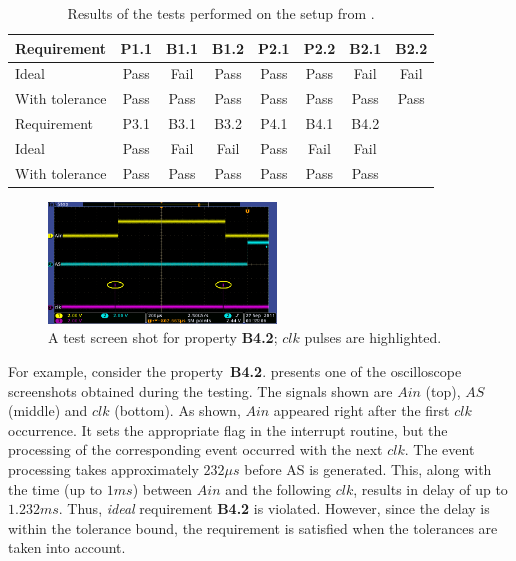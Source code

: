 \begin{table}[!b]


{
\begin{tabular}{|l|c|c|c|c|c|c|c|}
\hline
Requirement 		& P1.1 & B1.1 & B1.2 & P2.1 & P2.2 & B2.1 & B2.2 \\\hline
Ideal 					& Pass & Fail & Pass & Pass & Pass & Fail & Fail \\\hline
With tolerance 	& Pass & Pass & Pass & Pass & Pass & Pass & Pass \\\hline
\hline
Requirement 		& P3.1 & B3.1 & B3.2 & P4.1 & B4.1 & B4.2 &\\\hline
Ideal 					& Pass & Fail & Fail & Pass & Fail & Fail &\\\hline
With tolerance 	& Pass & Pass & Pass & Pass & Pass & Pass &\\\hline
\end{tabular}}
\caption{Results of the tests performed on the setup from .}
\label{tab:test_results}
\end{table}


\begin{figure} [!t]
\center
		\includegraphics[width=0.54\textwidth]{figs/tek00003_new1.png}
\caption{A test screen shot for property \textbf{B4.2}; $clk$ pulses are highlighted.}
\label{fig:screen1}
\end{figure}


For example, consider the property~\textbf{B4.2}.  presents one of the oscilloscope screenshots obtained during the testing. The signals shown are $Ain$ (top), $AS$ (middle) and $clk$ (bottom). As shown, $Ain$ appeared right after the first $clk$ occurrence. It sets the appropriate flag in the interrupt routine, but the processing of the corresponding event occurred with the next $clk$. The event processing takes approximately $232 \mu s$ before AS is generated. This, along with the time (up to $1 ms$) between $Ain$ and the following $clk$, results in delay of up to $1.232 ms$. Thus, \textit{ideal} requirement \textbf{B4.2} is violated. However, since the delay is within the tolerance bound, the requirement is satisfied when the tolerances are taken into account.




